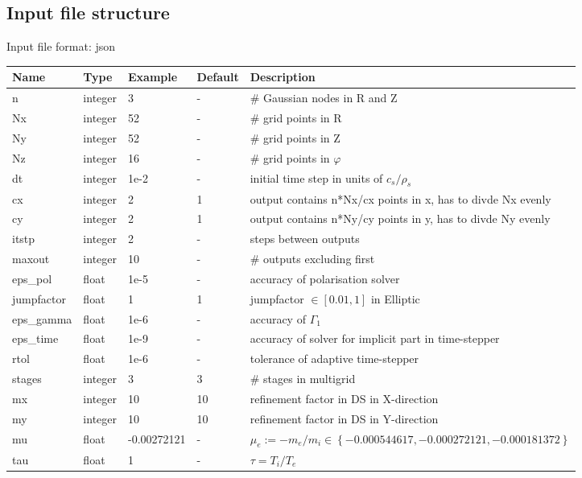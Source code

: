 \subsection{Input file structure}
Input file format: json

\begin{longtable}{llll>{\RaggedRight}p{7cm}}
\toprule
\rowcolor{gray!50}\textbf{Name} &  \textbf{Type} & \textbf{Example} & \textbf{Default} & \textbf{Description}  \\ \midrule
n      & integer & 3 & - &\# Gaussian nodes in R and Z \\
Nx     & integer &52& - &\# grid points in R \\
Ny     & integer &52& - &\# grid points in Z \\
Nz     & integer &16& - &\# grid points in $\varphi$ \\
dt     & integer &1e-2& - &initial time step in units of $c_s/\rho_s$ \\
cx & integer & 2 & 1 & output contains n*Nx/cx points in x,
    has to divde Nx evenly\\
cy & integer & 2 & 1 & output contains n*Ny/cy points in y,
    has to divde Ny evenly\\
itstp       & integer & 2  & - & steps between outputs \\
maxout      & integer & 10 & - & \# outputs excluding first \\
eps\_pol    & float & 1e-5  & - &  accuracy of polarisation solver \\
jumpfactor  & float & 1 & 1 &   jumpfactor $\in \left[0.01,1\right]$ in Elliptic\\
eps\_gamma  & float & 1e-6  & - & accuracy of $\Gamma_1$  \\
eps\_time   & float & 1e-9  & - & accuracy of solver for implicit part in time-stepper \\
rtol  & float &1e-6   & - &tolerance of adaptive time-stepper \\
stages      & integer & 3 & 3 & \# stages in multigrid  \\
mx     & integer & 10 & 10 & refinement factor in DS in X-direction\\
my     & integer & 10 & 10 & refinement factor in DS in Y-direction\\
mu         & float & -0.00272121& - & $\mu_e :=-m_e/m_i \in \left\{ -0.000544617, -0.000272121, -0.000181372 \right\}$\\
tau        & float &1      & - & $\tau = T_i/T_e$  \\

\end{longtable}
